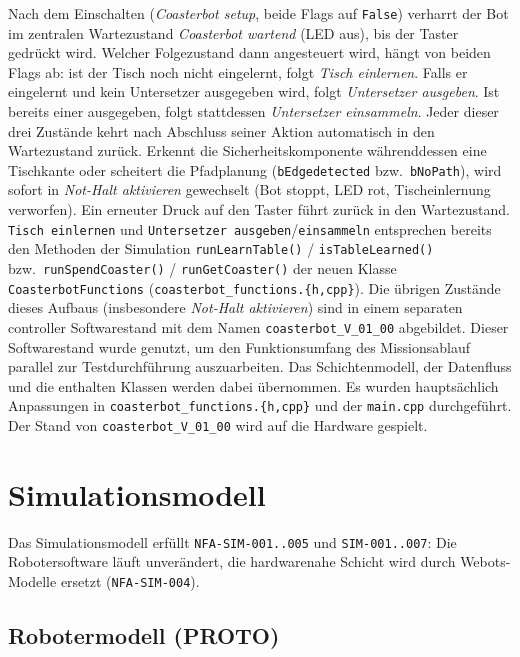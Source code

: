 \documentclass[
  a4paper,
  12pt,
  DIV=12,        %
  parskip=half,  %
  headings=small %
]{scrartcl}
\theoremstyle{definition}
\theoremstyle{definition}
\begin{document}
Nach dem Einschalten (\emph{Coasterbot setup}, beide Flags auf
\texttt{False}) verharrt der Bot im zentralen Wartezustand \emph{Coasterbot
wartend} (LED aus), bis der Taster gedrückt wird. Welcher Folgezustand
dann angesteuert wird, hängt von beiden Flags ab: ist der Tisch
noch nicht eingelernt, folgt \emph{Tisch einlernen}. Falls er eingelernt und
kein Untersetzer ausgegeben wird, folgt \emph{Untersetzer ausgeben}. Ist bereits
einer ausgegeben, folgt stattdessen \emph{Untersetzer einsammeln}. Jeder
dieser drei Zustände kehrt nach Abschluss seiner Aktion automatisch in den
Wartezustand zurück. Erkennt die Sicherheitskomponente währenddessen eine
Tischkante oder scheitert die Pfadplanung (\texttt{bEdgedetected} bzw.\
\texttt{bNoPath}), wird sofort in \emph{Not-Halt aktivieren} gewechselt
(Bot stoppt, LED rot, Tischeinlernung verworfen). Ein erneuter
Druck auf den Taster führt zurück in den Wartezustand. \texttt{Tisch
einlernen} und \texttt{Untersetzer ausgeben}/\texttt{einsammeln}
entsprechen bereits den Methoden der Simulation \texttt{runLearnTable()} /
\texttt{isTableLearned()} bzw.\ \texttt{runSpendCoaster()} /
\texttt{runGetCoaster()} der neuen Klasse \texttt{CoasterbotFunctions}
(\texttt{coasterbot\_functions.\{h,cpp\}}). Die übrigen Zustände dieses
Aufbaus (insbesondere \emph{Not-Halt aktivieren}) sind in einem separaten controller
Softwarestand mit dem Namen \texttt{coasterbot\_V\_01\_00} abgebildet.
Dieser Softwarestand wurde genutzt, um den Funktionsumfang des Missionsablauf parallel zur Testdurchführung 
auszuarbeiten. Das Schichtenmodell, der Datenfluss und die enthalten Klassen werden dabei übernommen. 
Es wurden hauptsächlich Anpassungen in \texttt{coasterbot\_functions.\{h,cpp\}} und der \texttt{main.cpp} durchgeführt. 
Der Stand von \texttt{coasterbot\_V\_01\_00} wird auf die Hardware gespielt.

\section{Simulationsmodell}\label{simulationsmodell}

Das Simulationsmodell erfüllt \texttt{NFA-SIM-001..005} und
\texttt{SIM-001..007}: Die Robotersoftware läuft unverändert, die
hardwarenahe Schicht wird durch Webots-Modelle ersetzt
(\texttt{NFA-SIM-004}).

\subsection{Robotermodell (PROTO)}\label{proto}
\end{document}
